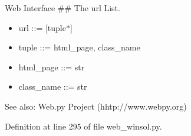 Web Interface \#\# The url List. 

\begin{itemize}
\item url ::= \mbox{[}tuple$\ast$\mbox{]} \item tuple ::= html\_\-page, class\_\-name \item html\_\-page ::= str \item class\_\-name ::= str\end{itemize}
\begin{Desc}
\item[See also:]Web.py Project (hhtp://www.webpy.org) \end{Desc}


Definition at line 295 of file web\_\-winsol.py.